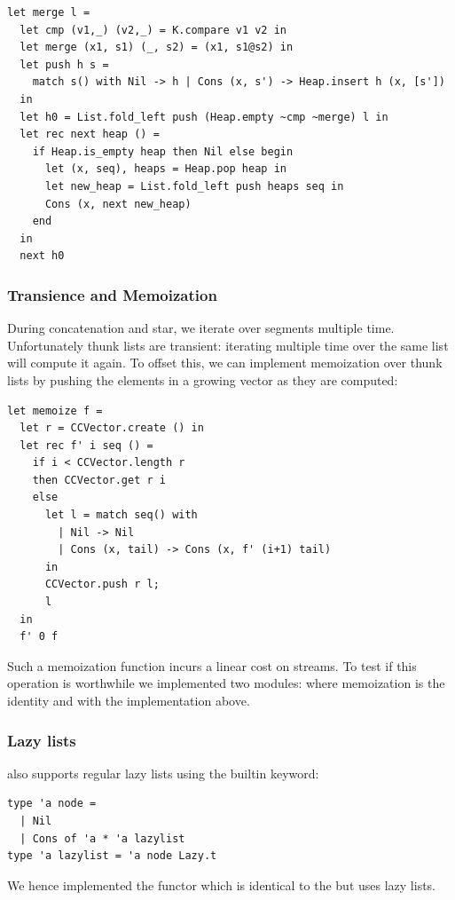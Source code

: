 \begin{lstlisting}
let merge l =
  let cmp (v1,_) (v2,_) = K.compare v1 v2 in
  let merge (x1, s1) (_, s2) = (x1, s1@s2) in
  let push h s =
    match s() with Nil -> h | Cons (x, s') -> Heap.insert h (x, [s'])
  in
  let h0 = List.fold_left push (Heap.empty ~cmp ~merge) l in
  let rec next heap () =
    if Heap.is_empty heap then Nil else begin
      let (x, seq), heaps = Heap.pop heap in
      let new_heap = List.fold_left push heaps seq in
      Cons (x, next new_heap)
    end
  in
  next h0
\end{lstlisting}

\subsubsection{Transience and Memoization}

During concatenation and star, we iterate over segments multiple time.
Unfortunately thunk lists are transient: iterating multiple time over the same list
will compute it again. To offset this, we can implement memoization
over thunk lists by pushing the elements in a growing vector as they are
computed:
\begin{lstlisting}
let memoize f =
  let r = CCVector.create () in
  let rec f' i seq () =
    if i < CCVector.length r
    then CCVector.get r i
    else 
      let l = match seq() with
        | Nil -> Nil
        | Cons (x, tail) -> Cons (x, f' (i+1) tail)
      in
      CCVector.push r l;
      l
  in
  f' 0 f
\end{lstlisting}

Such a memoization function incurs a linear cost on streams. To test
if this operation is worthwhile we implemented two modules:
 where memoization is the identity and 
with the implementation above.

\subsubsection{Lazy lists}

\ocaml also supports regular lazy lists using the builtin  keyword:

\begin{lstlisting}
type 'a node =
  | Nil
  | Cons of 'a * 'a lazylist
type 'a lazylist = 'a node Lazy.t
\end{lstlisting}

We hence implemented the  functor which is identical to the
 but uses lazy lists.

